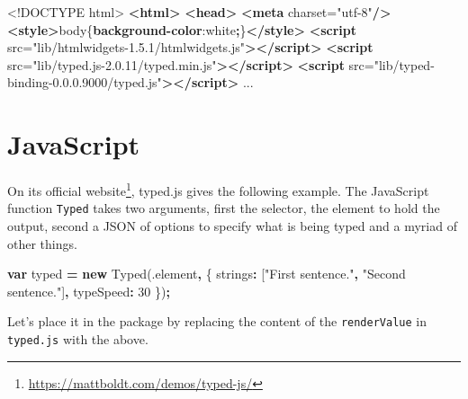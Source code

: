 \documentclass[
]{krantz}
\makeatletter
\newenvironment{Shaded}{\begin{snugshade}}{\end{snugshade}}
\newcommand{\ConstantTok}[1]{\textcolor[rgb]{0,0,0}{#1}}
\newcommand{\DataTypeTok}[1]{\textcolor[rgb]{0.27,0.27,0.27}{#1}}
\newcommand{\DecValTok}[1]{\textcolor[rgb]{0.06,0.06,0.06}{#1}}
\newcommand{\KeywordTok}[1]{\textcolor[rgb]{0.27,0.27,0.27}{\textbf{#1}}}
\newcommand{\NormalTok}[1]{#1}
\newcommand{\OperatorTok}[1]{\textcolor[rgb]{0.43,0.43,0.43}{\textbf{#1}}}
\newcommand{\OtherTok}[1]{\textcolor[rgb]{0.37,0.37,0.37}{#1}}
\newcommand{\StringTok}[1]{\textcolor[rgb]{0.5,0.5,0.5}{#1}}
\renewcommand{\href}[2]{#2\footnote{\url{#1}}}
\newenvironment{kframe}{%
\medskip{}
\setlength{\fboxsep}{.8em}
 \def\at@end@of@kframe{}%
 \ifinner\ifhmode%
  \def\at@end@of@kframe{\end{minipage}}%
  \begin{minipage}{\columnwidth}%
 \fi\fi%
 \def\FrameCommand##1{\hskip\@totalleftmargin \hskip-\fboxsep
 \colorbox{shadecolor}{##1}\hskip-\fboxsep
     \hskip-\linewidth \hskip-\@totalleftmargin \hskip\columnwidth}%
 \MakeFramed {\advance\hsize-\width
   \@totalleftmargin\z@ \linewidth\hsize
   \@setminipage}}%
 {\par\unskip\endMakeFramed%
 \at@end@of@kframe}
\renewenvironment{Shaded}{\begin{kframe}}{\end{kframe}}
\makeatother
\begin{document}
\begin{Shaded}
\begin{Highlighting}[]
\DataTypeTok{\textless{}!DOCTYPE }\NormalTok{html}\DataTypeTok{\textgreater{}}
\KeywordTok{\textless{}html\textgreater{}}
\KeywordTok{\textless{}head\textgreater{}}
\KeywordTok{\textless{}meta}\OtherTok{ charset=}\StringTok{"utf{-}8"}\KeywordTok{/\textgreater{}}
\KeywordTok{\textless{}style\textgreater{}}\NormalTok{body\{}\KeywordTok{background{-}color}\NormalTok{:}\ConstantTok{white}\OperatorTok{;}\NormalTok{\}}\KeywordTok{\textless{}/style\textgreater{}}
\KeywordTok{\textless{}script}\OtherTok{ src=}\StringTok{"lib/htmlwidgets{-}1.5.1/htmlwidgets.js"}\KeywordTok{\textgreater{}\textless{}/script\textgreater{}}
\KeywordTok{\textless{}script}\OtherTok{ src=}\StringTok{"lib/typed.js{-}2.0.11/typed.min.js"}\KeywordTok{\textgreater{}\textless{}/script\textgreater{}}
\KeywordTok{\textless{}script}\OtherTok{ src=}\StringTok{"lib/typed{-}binding{-}0.0.0.9000/typed.js"}\KeywordTok{\textgreater{}\textless{}/script\textgreater{}}
\NormalTok{...}
\end{Highlighting}
\end{Shaded}

\hypertarget{javascript-1}{%
\section*{JavaScript}\label{javascript-1}}


On its \href{https://mattboldt.com/demos/typed-js/}{official website}, typed.js gives the following example. The JavaScript function \texttt{Typed} takes two arguments, first the selector, the element to hold the output, second a JSON of options to specify what is being typed and a myriad of other things.

\begin{Shaded}
\begin{Highlighting}[]
\KeywordTok{var}\NormalTok{ typed }\OperatorTok{=} \KeywordTok{new}\NormalTok{ Typed(}\StringTok{\textquotesingle{}.element\textquotesingle{}}\OperatorTok{,}\NormalTok{ \{}
  \DataTypeTok{strings}\OperatorTok{:}\NormalTok{ [}\StringTok{"First sentence."}\OperatorTok{,} \StringTok{"Second sentence."}\NormalTok{]}\OperatorTok{,}
  \DataTypeTok{typeSpeed}\OperatorTok{:} \DecValTok{30}
\NormalTok{\})}\OperatorTok{;}
\end{Highlighting}
\end{Shaded}

Let's place it in the package by replacing the content of the \texttt{renderValue} in \texttt{typed.js} with the above.
\end{document}
